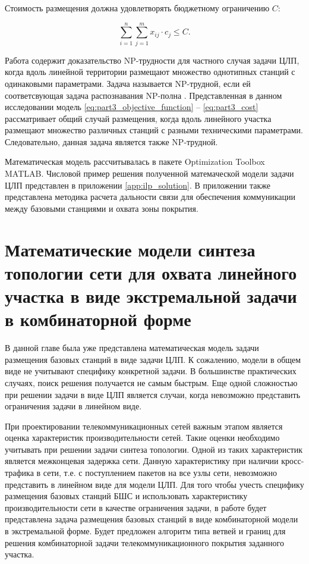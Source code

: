 Стоимость размещения должна удовлетворять бюджетному ограничению $C$:

\begin{equation}
  \label{eq:part3_cost}
  \sum\limits_{i=1}^n \sum\limits_{j=1}^m x_{ij} \cdot c_j \leq C.
\end{equation}

Работа \cite{Ivanov2018} содержит доказательство NP-трудности для частного случая задачи ЦЛП, когда вдоль линейной территории размещают множество однотипных станций с одинаковыми параметрами. Задача называется NP-трудной, если ей соответсвующая задача распознавания NP-полна \cite{Pershin2013}.  Представленная в данном исследовании модель \cref{eq:part3_objective_function} -- \cref{eq:part3_cost} рассматривает общий случай размещения, когда вдоль линейного участка размещают множество различных станций с разными техническими параметрами. Следовательно, данная задача является также NP-трудной.

Математическая модель рассчитывалась в пакете Optimization Toolbox MATLAB. Числовой пример решения полученной матемаческой модели задачи ЦЛП представлен в приложении \cref{app:ilp_solution}. В приложении также представлена методика расчета дальности связи для обеспечения коммуникации между базовыми станциями и охвата зоны покрытия.


\section{Математические модели синтеза топологии сети для охвата линейного участка в виде экстремальной задачи в комбинаторной форме}

В данной главе была уже представлена математическая модель задачи размещения базовых станций в виде задачи ЦЛП. К сожалению, модели в общем виде не учитывают специфику конкретной задачи. В большинстве практических случаях, поиск решения получается не самым быстрым. Еще одной сложностью при решении задачи в виде ЦЛП является случаи, когда невозможно представить ограничения задачи в линейном виде. 

При проектировании телекоммуникационных сетей важным этапом является оценка характеристик производительности сетей. Такие оценки необходимо учитывать при решении задачи синтеза топологии. Одной из таких характеристик является межконцевая задержка сети. Данную характеристику при наличии кросс-трафика в сети, т.е. с поступлением пакетов на все узлы сети, невозможно представить в линейном виде для модели ЦЛП. Для того чтобы учесть специфику размещения базовых станций БШС и использовать характеристику производительности сети в качестве ограничения задачи, в работе будет представлена задача размещения базовых станций в виде комбинаторной модели в экстремальной форме. Будет предложен алгоритм типа ветвей и границ для решения комбинаторной задачи телекоммуникационного покрытия заданного участка.

